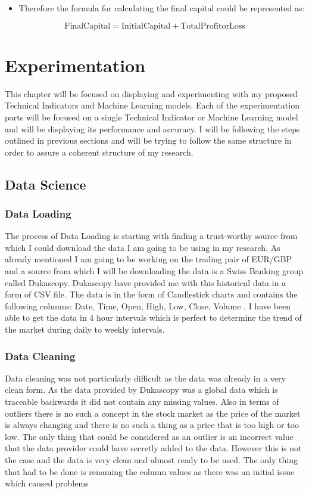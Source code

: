 \documentclass{imc-inf}
\begin{document}
			\begin{itemize}
				\item Therefore the formula for calculating the final capital could be represented as:
			\end{itemize}
			\begin{equation}
				\mathrm{Final Capital} = \mathrm{Initial Capital} + \mathrm{Total Profit or Loss}
			\end{equation}
			

\chapter{Experimentation}
	This chapter will be focused on displaying and experimenting with my proposed Technical Indicators and Machine Learning models. Each of the experimentation 
	parts will be focused on a single Technical Indicator or Machine Learning model and will be displaying its performance and accuracy. I will be following the 
	steps outlined in previous sections and will be trying to follow the same structure in order to assure a coherent structure of my research. 

	\section{Data Science}
		\subsection{Data Loading}
			The process of Data Loading is starting with finding a trust-worthy source from which I could download the data I am going to be using in my 
			research. As already mentioned  I am going to be working on the trading pair of EUR/GBP and a source from which I will be downloading the data 
			is a Swiss Banking group called Dukascopy. Dukascopy have provided me with this historical data in a form of CSV file. The data is in the form of
			Candlestick charts and contains the following columns: Date, Time, Open, High, Low, Close, Volume \cite{Technical_Indicators_with_the_Volume}. I have been able to get the data in 4 hour intervals
			which is perfect to determine the trend of the market during daily to weekly intervals. 
		\subsection{Data Cleaning}
			Data cleaning was not particularly difficult as the data was already in a very clean form. As the data provided by Dukascopy was a global data which is 
			traceable backwards it did not contain any missing values. Also in terms of outliers there is no such a concept in the stock market as the price of the 
			market is always changing and there is no such a thing as a price that is too high or too low. The only thing that could be considered as an outlier is 
			an incorrect value that the data provider could have secretly added to the data. However this is not the case and the data is very clean and almost ready to be used.
			The only thing that had to be done is renaming the column values as there was an initial issue which caused problems
\end{document}
